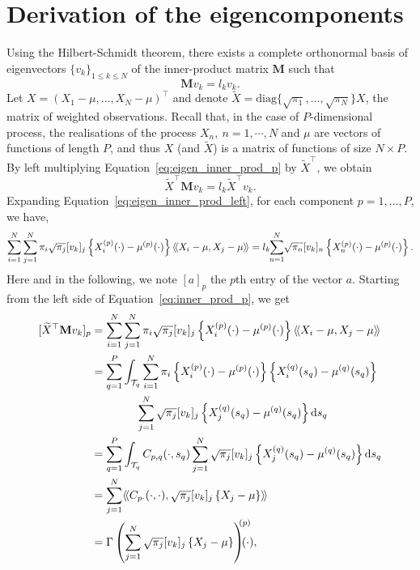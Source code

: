 \section{Derivation of the eigencomponents} %
\label{sec:derivation_of_the_eigencomponents}

Using the Hilbert-Schmidt theorem, there exists a complete orthonormal basis of eigenvectors $\{v_k\}_{1 \leq k \leq N}$ of the inner-product matrix $\mathbf{M}$ such that
\begin{equation}\label{eq:eigen_inner_prod_p}
    \mathbf{M}v_k = l_kv_k.
\end{equation}
Let $X = \left(X_1 - \mu, \dots, X_N - \mu\right)^\top$ and denote $\widetilde{X} = \text{diag}\{\sqrt{\pi_1}, \dots, \sqrt{\pi_N}\}X$, the matrix of weighted observations. Recall that, in the case of $P$-dimensional process, the realisations of the process $X_n,~n = 1, \cdots, N$ and $\mu$ are vectors of functions of length $P$, and thus $X$ (and $\widetilde{X}$) is a matrix of functions of size $N \times P$. By left multiplying Equation~\eqref{eq:eigen_inner_prod_p} by $\widetilde{X}^\top$, we obtain
\begin{equation}\label{eq:eigen_inner_prod_left}
    \widetilde{X}^\top \mathbf{M} v_k = l_k \widetilde{X}^\top v_k.
\end{equation} 
Expanding Equation~\eqref{eq:eigen_inner_prod_left}, for each component $p = 1, \dots, P$, we have,
\begin{equation}\label{eq:inner_prod_p}
    \sum_{i = 1}^N \sum_{j = 1}^N \pi_i \sqrt{\pi_j}[v_{k}]_j\left\{X_i^{(p)}(\cdot) - \mu^{(p)}(\cdot)\right\}\langle\!\langle X_i - \mu, X_j - \mu\rangle\!\rangle = l_k \mkern-5mu\sum_{n = 1}^N \mkern-4mu\sqrt{\pi_n}[v_{k}]_n\left\{X_n^{(p)}(\cdot) - \mu^{(p)}(\cdot)\right\}.
\end{equation}
Here and in the following, we note $[a]_p$ the $p$th entry of the vector $a$. Starting from the left side of Equation~\eqref{eq:inner_prod_p}, we get
\begin{align}\label{eq:inner_prod_p_left}
[\widetilde{X}^\top \mathbf{M} v_k]_p &= \sum_{i = 1}^N \sum_{j = 1}^N \pi_i \sqrt{\pi_j} [v_{k}]_j \left\{X_i^{(p)}(\cdot) - \mu^{(p)}(\cdot)\right\}\inH{X_i - \mu}{X_j - \mu}\\
&= \sum_{q = 1}^P \int_{\TT{q}} \sum_{i = 1}^N \pi_i\left\{X_i^{(p)}(\cdot) - \mu^{(p)}(\cdot)\right\} \left\{X_i^{(q)}(s_q) - \mu^{(q)}(s_q)\right\}  \\
&\qquad\qquad \sum_{j = 1}^N \sqrt{\pi_j}[v_{k}]_j \left\{X_j^{(q)}(s_q) - \mu^{(q)}(s_q)\right\} \dd s_q \\
&= \sum_{q = 1}^P \int_{\TT{q}} C_{p,q}(\cdot, s_q)\sum_{j = 1}^N \sqrt{\pi_j}[v_{k}]_j \left\{X_j^{(q)}(s_q) - \mu^{(q)}(s_q)\right\} \dd s_q \\
&= \sum_{j = 1}^N \inH{C_{p \cdot}(\cdot, \cdot)}{\sqrt{\pi_j}[v_{k}]_j \left\{X_j - \mu\right\}} \\
&= \Gamma\left(\sum_{j = 1}^N \sqrt{\pi_j}[v_{k}]_j \left\{X_j - \mu\right\} \right)^{\mkern-9mu(p)}\mkern-18mu(\cdot),
\end{align}
